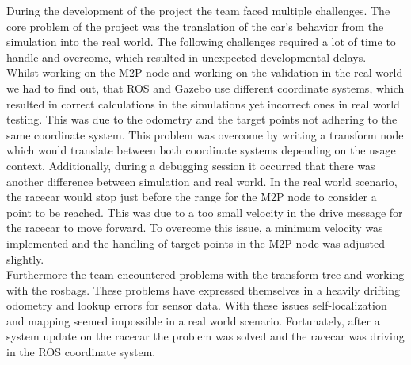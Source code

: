 During the development of the project the team faced multiple challenges. The core problem of the project was the translation of the car's behavior from the simulation into the real world. The following challenges required a lot of time to handle and overcome, which resulted in unexpected developmental delays.\\
\newline
Whilst working on the M2P node and working on the validation in the real world we had to find out, that ROS and Gazebo use different coordinate systems, which resulted in correct calculations in the simulations yet incorrect ones in real world testing. This was due to the odometry and the target points not adhering to the same coordinate system. This problem was overcome by writing a transform node which would translate between both coordinate systems depending on the usage context. 
Additionally, during a debugging session it occurred that there was another difference between simulation and real world. In the real world scenario, the racecar would stop just before the range for the M2P node to consider a point to be reached. This was due to a too small velocity in the drive message for the racecar to move forward. To overcome this issue, a minimum velocity was implemented and the handling of target points in the M2P node was adjusted slightly.\\
\newline
Furthermore the team encountered problems with the transform tree and working with the rosbags. These problems have expressed themselves in a heavily drifting odometry and lookup errors for sensor data. With these issues self-localization and mapping seemed impossible in a real world scenario. Fortunately, after a system update on the racecar the problem was solved and the racecar was driving in the ROS coordinate system.
